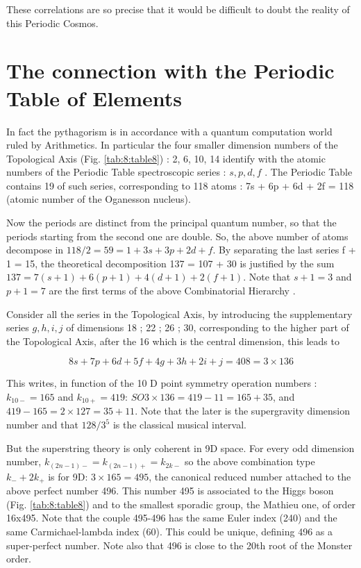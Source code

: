 \documentclass[a4paper,9pt]{article}
\begin{document}
These correlations are so precise that it would be difficult to doubt the reality of this Periodic Cosmos.





\section{The connection with the Periodic Table of Elements}

     In fact the pythagorism is in accordance with a quantum computation world ruled by Arithmetics. In particular the four smaller dimension numbers of the Topological Axis (Fig. \ref{tab:8:table8}) : 2, 6, 10, 14 identify with the atomic numbers of the Periodic Table spectroscopic series : $s, p, d, f$ . The Periodic Table contains 19 of such series, corresponding to 118 atoms : 7s + 6p + 6d + 2f = 118 (atomic number of the Oganesson nucleus). 
     

     Now the periods are distinct from the principal quantum number, so that the periods starting from the second one are double. So, the above number of atoms decompose in $118/2 = 59 = 1 + 3s + 3p + 2d + f$.  By separating the last series f + 1 = 15, the theoretical decomposition 137 = 107 + 30 is justified by the sum $137 = 7(s +1) + 6(p +1) + 4(d +1) + 2(f +1)$. Note that $s + 1 = 3$ and $p + 1 = 7$ are the first terms of the above Combinatorial Hierarchy\cite{Bastin} .



     Consider all the series in the Topological Axis, by introducing the supplementary series $g, h, i, j$ of dimensions 18 ; 22 ; 26 ; 30, corresponding to the higher part of the Topological Axis, after the 16 which is the central dimension, this leads to
     
     \begin{equation}
      8s + 7p + 6 d + 5f + 4g + 3h + 2i + j = 408 = 3 \times 136   
     \end{equation}
      
     
     This writes, in function of the 10 D point symmetry operation numbers :  $k_{10-} = 165$ and $k_{10+} = 419$: $SO3 \times 136 = 419 - 11 = 165 + 35$, and $419-165 = 2 \times 127 =  35 + 11$. Note that the later is the supergravity dimension number and that $128/3^5$ is the classical musical interval. 
     
     
     But the superstring theory is only coherent in 9D space. For every odd dimension number, $k_{(2n - 1)-} = k_{(2n - 1)+} = k_{2k-}$ so the above combination type $k_- + 2k_+$ is for 9D: $3 \times 165 = 495$, the canonical reduced number attached to the above perfect number 496. This number 495 is associated to the Higgs boson (Fig. \ref{tab:8:table8}) and to the smallest sporadic group, the Mathieu one, of order 16x495. Note that the couple 495-496 has the same Euler index (240) and the same Carmichael-lambda index (60). This could be unique, defining 496 as a super-perfect number. Note also that 496 is close to the 20th root of the Monster order.
 
\end{document}
